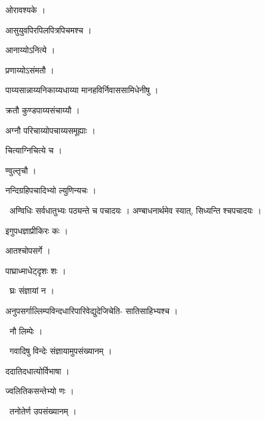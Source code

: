 \documentclass[10pt, openany, oneside]{book}
\begin{document}
\noindent ओरावश्यके ।

\noindent आसुयुवपिरपिलपित्रपिचमश्च ।

\noindent आनाय्योऽनित्ये ।

\noindent प्रणाय्योऽसंमतौ ।

\noindent पाय्यसान्नाय्यनिकाय्यधाय्या मानहविर्निवाससामिधेनीषु ।

\noindent क्रतौ कुण्डपाय्यसंचाय्यौ ।

\noindent अग्नौ परिचाय्योपचाय्यसमूह्याः ।

\noindent चित्याग्निचित्ये च ।

\noindent ण्वुल्तृचौ ।

\noindent नन्दिग्रहिपचादिभ्यो ल्युणिन्यचः ।

\par\noindent\hspace{1.5em}{\vps वा॰}~{\qt अण्विधिः सर्वधातुभ्यः पठ्यन्ते च पचादयः । अण्बाधनार्थमेव स्यात्, सिध्यन्ति श्चपचादयः ।}

\noindent इगुपधज्ञाप्रीकिरः कः ।

\noindent आतश्चोपसर्गे ।

\noindent पाघ्राध्माधेट्दृशः शः ।

\par\noindent\hspace{1.5em}{\vps वा॰}~{\qt घ्रः संज्ञायां न ।}

\noindent अनुपसर्गाल्लिम्पविन्दधारिपारिवेद्युदेजिचेति- सातिसाहिभ्यश्च ।

\par\noindent\hspace{1.5em}{\vps वा॰}~{\qt नौ लिम्पेः ।}

\par\noindent\hspace{1.5em}{\vps वा॰}~{\qt गवादिषु विन्देः संज्ञायामुपसंख्यानम् ।}

\noindent ददातिदधात्योर्विभाषा ।

\noindent ज्वलितिकसन्तेभ्यो णः ।

\par\noindent\hspace{1.5em}{\vps वा॰}~{\qt तनोतेर्ण उपसंख्यानम् ।}
\end{document}
